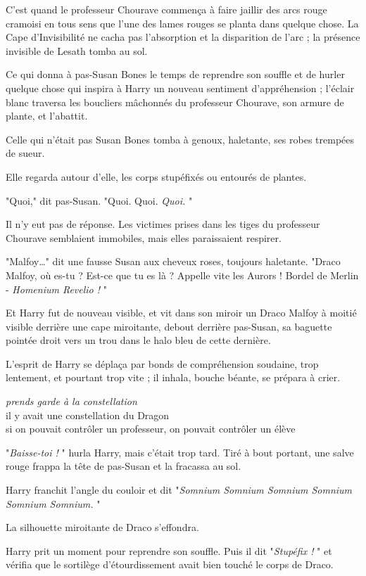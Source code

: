 C'est quand le professeur Chourave commença à faire jaillir des arcs rouge cramoisi en tous sens que l'une des lames rouges se planta dans quelque chose. La Cape d'Invisibilité ne cacha pas l'absorption et la disparition de l'arc ; la présence invisible de Lesath tomba au sol.

Ce qui donna à pas-Susan Bones le temps de reprendre son souffle et de hurler quelque chose qui inspira à Harry un nouveau sentiment d'appréhension ; l'éclair blanc traversa les boucliers mâchonnés du professeur Chourave, son armure de plante, et l'abattit.

Celle qui n'était pas Susan Bones tomba à genoux, haletante, ses robes trempées de sueur.

Elle regarda autour d'elle, les corps stupéfixés ou entourés de plantes.

"Quoi," dit pas-Susan. "Quoi. Quoi. \emph{Quoi.} "

Il n'y eut pas de réponse. Les victimes prises dans les tiges du professeur Chourave semblaient immobiles, mais elles paraissaient respirer.

"Malfoy…" dit une fausse Susan aux cheveux roses, toujours haletante. "Draco Malfoy, où es-tu ? Est-ce que tu es là ? Appelle vite les Aurors ! Bordel de Merlin - \emph{Homenium Revelio !} "

Et Harry fut de nouveau visible, et vit dans son miroir un Draco Malfoy à moitié visible derrière une cape miroitante, debout derrière pas-Susan, sa baguette pointée droit vers un trou dans le halo bleu de cette dernière.

L'esprit de Harry se déplaça par bonds de compréhension soudaine, trop lentement, et pourtant trop vite ; il inhala, bouche béante, se prépara à crier.

\emph{prends garde à la constellation} \\il y avait une constellation du Dragon\\si on pouvait contrôler un professeur, on pouvait contrôler un élève

"\emph{Baisse-toi !} " hurla Harry, mais c'était trop tard. Tiré à bout portant, une salve rouge frappa la tête de pas-Susan et la fracassa au sol.

Harry franchit l'angle du couloir et dit "\emph{Somnium Somnium Somnium Somnium Somnium Somnium.} "

La silhouette miroitante de Draco s'effondra.

Harry prit un moment pour reprendre son souffle. Puis il dit "\emph{Stupéfix !} " et vérifia que le sortilège d'étourdissement avait bien touché le corps de Draco.

